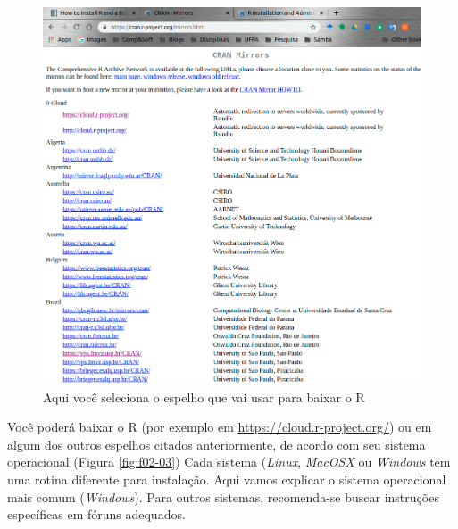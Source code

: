 \documentclass[12pt,a4paper,oneside]{erdc}
\begin{document}
\begin{figure}[htpb]
	\centering
	\includegraphics[width=\linewidth]{../figs/BP_Curso_TecComp_00_2019_f02-02}
	\caption{Aqui você seleciona o espelho que vai usar para baixar o R}
	\label{fig:f02-02}
\end{figure}

Você poderá baixar o R (por exemplo em \url{https://cloud.r-project.org/}) ou em algum dos outros espelhos citados anteriormente, de acordo com seu sistema operacional (Figura \ref{fig:f02-03}) Cada sistema (\textit{Linux}, \textit{MacOSX} ou \textit{Windows} tem uma rotina diferente para instalação. Aqui vamos explicar o sistema operacional mais comum (\textit{Windows}). Para outros sistemas, recomenda-se buscar instruções específicas em fóruns adequados.
\end{document}
